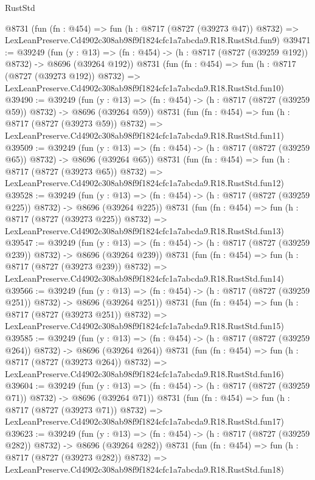 \begin{lexlean}{RustStd}
\begin{coremodule}
    @8731
    (fun (fn : @454) =>
    fun (h : @8717 (@8727 (@39273 @47)) @8732) =>
    LexLeanPreserve.Cd4902c308ab98f9f1824cfc1a7abcda9.R18.RustStd.fun9)
@39471 := @39249
    (fun (y : @13) => (fn : @454) -> (h : @8717 (@8727 (@39259 @192)) @8732) -> @8696 (@39264 @192))
    @8731
    (fun (fn : @454) =>
    fun (h : @8717 (@8727 (@39273 @192)) @8732) =>
    LexLeanPreserve.Cd4902c308ab98f9f1824cfc1a7abcda9.R18.RustStd.fun10)
@39490 := @39249
    (fun (y : @13) => (fn : @454) -> (h : @8717 (@8727 (@39259 @59)) @8732) -> @8696 (@39264 @59))
    @8731
    (fun (fn : @454) =>
    fun (h : @8717 (@8727 (@39273 @59)) @8732) =>
    LexLeanPreserve.Cd4902c308ab98f9f1824cfc1a7abcda9.R18.RustStd.fun11)
@39509 := @39249
    (fun (y : @13) => (fn : @454) -> (h : @8717 (@8727 (@39259 @65)) @8732) -> @8696 (@39264 @65))
    @8731
    (fun (fn : @454) =>
    fun (h : @8717 (@8727 (@39273 @65)) @8732) =>
    LexLeanPreserve.Cd4902c308ab98f9f1824cfc1a7abcda9.R18.RustStd.fun12)
@39528 := @39249
    (fun (y : @13) => (fn : @454) -> (h : @8717 (@8727 (@39259 @225)) @8732) -> @8696 (@39264 @225))
    @8731
    (fun (fn : @454) =>
    fun (h : @8717 (@8727 (@39273 @225)) @8732) =>
    LexLeanPreserve.Cd4902c308ab98f9f1824cfc1a7abcda9.R18.RustStd.fun13)
@39547 := @39249
    (fun (y : @13) => (fn : @454) -> (h : @8717 (@8727 (@39259 @239)) @8732) -> @8696 (@39264 @239))
    @8731
    (fun (fn : @454) =>
    fun (h : @8717 (@8727 (@39273 @239)) @8732) =>
    LexLeanPreserve.Cd4902c308ab98f9f1824cfc1a7abcda9.R18.RustStd.fun14)
@39566 := @39249
    (fun (y : @13) => (fn : @454) -> (h : @8717 (@8727 (@39259 @251)) @8732) -> @8696 (@39264 @251))
    @8731
    (fun (fn : @454) =>
    fun (h : @8717 (@8727 (@39273 @251)) @8732) =>
    LexLeanPreserve.Cd4902c308ab98f9f1824cfc1a7abcda9.R18.RustStd.fun15)
@39585 := @39249
    (fun (y : @13) => (fn : @454) -> (h : @8717 (@8727 (@39259 @264)) @8732) -> @8696 (@39264 @264))
    @8731
    (fun (fn : @454) =>
    fun (h : @8717 (@8727 (@39273 @264)) @8732) =>
    LexLeanPreserve.Cd4902c308ab98f9f1824cfc1a7abcda9.R18.RustStd.fun16)
@39604 := @39249
    (fun (y : @13) => (fn : @454) -> (h : @8717 (@8727 (@39259 @71)) @8732) -> @8696 (@39264 @71))
    @8731
    (fun (fn : @454) =>
    fun (h : @8717 (@8727 (@39273 @71)) @8732) =>
    LexLeanPreserve.Cd4902c308ab98f9f1824cfc1a7abcda9.R18.RustStd.fun17)
@39623 := @39249
    (fun (y : @13) => (fn : @454) -> (h : @8717 (@8727 (@39259 @282)) @8732) -> @8696 (@39264 @282))
    @8731
    (fun (fn : @454) =>
    fun (h : @8717 (@8727 (@39273 @282)) @8732) =>
    LexLeanPreserve.Cd4902c308ab98f9f1824cfc1a7abcda9.R18.RustStd.fun18)

\end{coremodule}
\end{lexlean}
